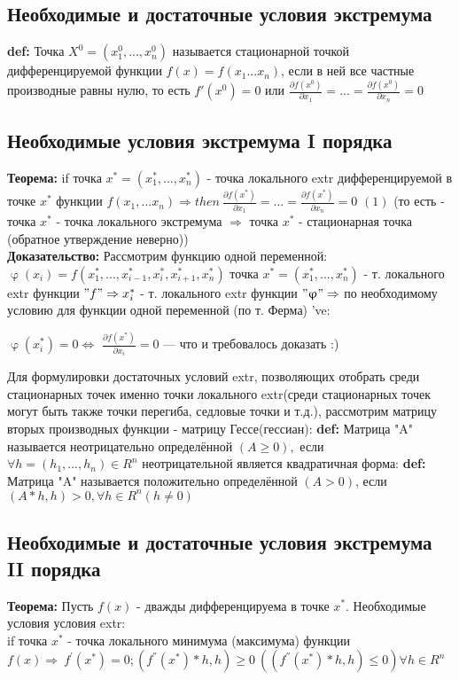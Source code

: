 \subsection{Необходимые и достаточные условия экстремума}
\textbf{def:} Точка $X^0=(x^0_1,...,x^0_n)$ называется стационарной точкой дифференцируемой функции $f(x)=f(x_1... x_n)$, если в ней все частные производные равны нулю, то есть $f'(x^0)=0$ или $\frac{\partial f(x^0)}{\partial x_1} = ... = \frac{\partial f(x^0)}{\partial x_n} = 0$
\subsection{Необходимые условия экстремума I порядка}
\textbf{Теорема: }if точка $x^*=(x_1^*, ..., x_n^*)$ - точка локального extr дифференцируемой в точке $x^* $ функции $ f(x_1, ... x_n) \Rightarrow then \ \frac{\partial f(x^*)}{\partial x_1} = ... = \frac{\partial f(x^*)}{\partial x_n} = 0$ $(1)$ (то есть - точка $x^{*}$ - точка локального экстремума $\Rightarrow$ точка $x^{*}$ - стационарная точка (обратное утверждение неверно)) \\ [2mm]
\textbf{Доказательство:} Рассмотрим функцию одной переменной:\\ $\upvarphi (x_i)=f(x_1^*,..., x_{i-1}^*, x_i^*, x_{i+1}^*, x_n^*)$ точка $x^*=(x_1^*,...,x_n^*)$ - т. локального extr функции $"f" \Rightarrow x_i^*$ - т. локального extr функции $"\upvarphi" \Rightarrow$ по необходимому условию для функции одной переменной (по т. Ферма) 've:
\begin{center}
$\upvarphi(x_i^*)=0 \Leftrightarrow $ $\frac{\partial f(x^*)}{\partial x_i} = 0$ --- что и требовалось доказать :)
\end{center}
Для формулировки достаточных условий extr, позволяющих отобрать среди стационарных точек именно точки локального extr(среди стационарных точек могут быть также точки перегиба, седловые точки и т.д.), рассмотрим матрицу вторых производных функции - матрицу Гессе(гессиан):
\textbf{def:} Матрица "A" называется неотрицательно определённой $(A \geq 0),$  если $\forall h = (h_1,...,h_n) \in R^n$ неотрицательной является квадратичная форма:
\textbf{def:} Матрица "A" называется положительно определённой $(A>0)$, если $(A*h, h)>0, \forall h \in R^n (h \neq 0)$

\subsection{Необходимые и достаточные условия экстремума II порядка}
\textbf{Теорема:} Пусть $f(x)$ - дважды дифференцируема в точке $x^*$. Необходимые условия условия extr: \\
if точка $x^*$ - точка локального минимума (максимума) функции $
f(x) \Rightarrow \  f^{'}(x^*)=0; (f^{''}(x^*)*h, h) \geq 0 \ ((f^{''}(x^*)*h, h) \leq 0) \forall h \in R^n$
